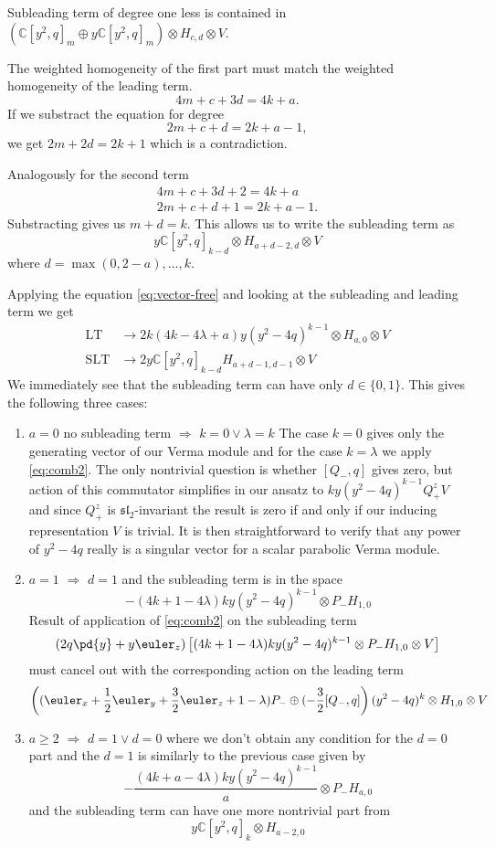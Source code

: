 Subleading term of degree one less is contained in $(\mathbb{C}[y^2, q]_m \oplus y\mathbb{C}[y^2, q]_m)\otimes H_{c,d} \otimes V$.

The weighted homogeneity of the first part must match the weighted homogeneity of the leading term.
\[
4m + c + 3d = 4k + a.
\]
If we substract the equation for degree
\[
2m + c + d = 2k + a - 1,
\]
we get $2m + 2d = 2k + 1$ which is a contradiction.

Analogously for the second term
\begin{gather*}
4m + c + 3d + 2 = 4k + a \\
2m + c + d + 1= 2k + a - 1.
\end{gather*}
Substracting gives us $ m + d = k $. This allows us to write the subleading term as
\[
y\mathbb{C}[y^2, q]_{k-d}\otimes H_{a+d-2, d} \otimes V
\]
where $d = \max(0, 2-a), \ldots, k$.

Applying the equation \eqref{eq:vector-free} and looking at the subleading and leading term we get
\begin{align}
\mathrm{LT} &\longrightarrow 2k(4k - 4\lambda + a)y(y^2-4q)^{k-1}\otimes H_{a,0} \otimes V \\
\mathrm{SLT} &\longrightarrow 2y\mathbb{C}[y^2, q]_{k-d}H_{a+d-1, d-1} \otimes V
\end{align}
We immediately see that the subleading term can have only $d \in \{0, 1\}$. This gives the following three cases:
\begin{enumerate}
\item $a=0$ no subleading term $\Rightarrow$ $k=0 \vee \lambda = k$ The case $k=0$ gives only the generating vector of our Verma module and for the case $k=\lambda$ we apply \eqref{eq:comb2}. The only nontrivial question is whether $[Q_-, q]$ gives zero, but action of this commutator simplifies in our ansatz to $ky(y^2-4q)^{k-1}Q_+^z V$ and since $Q_+^z$ is $\mathfrak{sl}_2$-invariant the result is zero if and only if  our inducing representation $V$ is trivial. It is then straightforward to verify that any power of $y^2-4q$ really is a singular vector for a scalar parabolic Verma module.
\item $a=1$ $\Rightarrow$ $d=1$ and the subleading term is in the space
\[
    -(4k+1-4\lambda)ky(y^2-4q)^{k-1}\otimes P_- H_{1,0}
\]
Result of application of \eqref{eq:comb2} on the subleading term
\[
    (2q\pd{y} + y\euler_z) \left[ (4k+1-4\lambda)ky(y^2-4q)^{k-1}\otimes P_- H_{1,0} \otimes V \right]
\]
must cancel out with the corresponding action on the leading term
\[
\left((\euler_x + \frac{1}{2}\euler_y + \frac{3}{2}\euler_z + 1 - \lambda)P_- \oplus (-\frac{3}{2}[Q_-,q] \right) (y^2-4q)^k\otimes H_{1,0}\otimes V
\]
\item $a \geq 2$ $\Rightarrow$ $d=1 \vee d=0$ where we don't obtain any condition for the $d=0$ part and the $d=1$ is similarly to the previous case given by
\[
    -\frac{(4k+a-4\lambda)ky(y^2-4q)^{k-1}}{a}\otimes P_- H_{a,0}
\]
and the subleading term can have one more nontrivial part from
\[
    y\mathbb{C}[y^2,q]_k\otimes H_{a-2,0}
\]
\end{enumerate}

